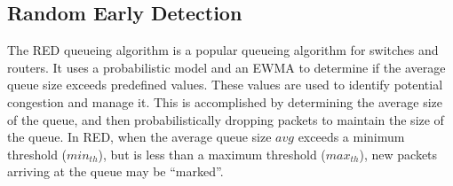 %


\subsection{Random Early Detection}
The \ac{RED} queueing algorithm is a popular queueing algorithm for switches and routers.
It uses a probabilistic model and an \ac{EWMA} to determine if the average queue size exceeds predefined values.
These values are used to identify potential congestion and manage it.
This is accomplished by determining the average size of the queue, and then probabilistically dropping packets to maintain the size of the queue.
In \ac{RED}, when the average queue size $avg$ exceeds a minimum threshold ($min_{th}$), but is less than a maximum threshold ($max_{th}$), new packets arriving at the queue may be ``marked''.


